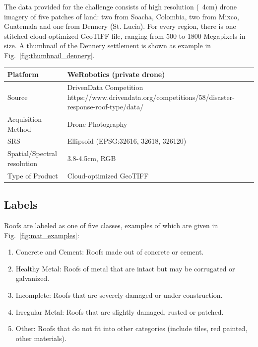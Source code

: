 \documentclass[11pt]{article}
\begin{document}
	The data provided for the challenge consists of high resolution (~4cm) drone imagery of five patches of land: two from Soacha, Colombia, two from Mixco, Guatemala and one from Dennery (St. Lucia).
	For every region, there is one stitched cloud-optimized GeoTIFF file, ranging from 500 to 1800 Megapixels in size. A thumbnail of the Dennery settlement is shown as example in Fig.~\ref{fig:thumbnail_dennery}.\\


	\begin{center}
		\begin{tabular}{ | m{5cm} | m{10cm}|} 
			\hline
			Platform & WeRobotics (private drone)  \\ 
			\hline
			Source & DrivenData Competition \newline https://www.drivendata.org/competitions/58/disaster-response-roof-type/data/ \\ 
			\hline
			Acquisition Method & Drone Photography  \\ 
			\hline
			SRS  & Ellipsoid (EPSG:32616, 32618, 326120)  \\ 
			\hline
			Spatial/Spectral resolution & 3.8-4.5cm, RGB  \\ 
			\hline
			Type of Product & Cloud-optimized GeoTIFF \\ 
			\hline
		\end{tabular}
	\end{center}
	
	\subsection{Labels}
	
	Roofs are labeled as one of five classes, examples of which are given in Fig.~\ref{fig:mat_examples}: 
	
	\begin{enumerate}
		\itemsep0em
		\item Concrete and Cement: Roofs made out of concrete or cement.
		\item Healthy Metal: Roofs of metal that are intact but may be corrugated or galvanized.
		\item Incomplete: Roofs that are severely damaged or under construction.
		\item Irregular Metal: Roofs that are slightly damaged, rusted or patched.
		\item Other: Roofs that do not fit into other categories (include tiles, red painted, other materials).
	\end{enumerate}
\end{document}
